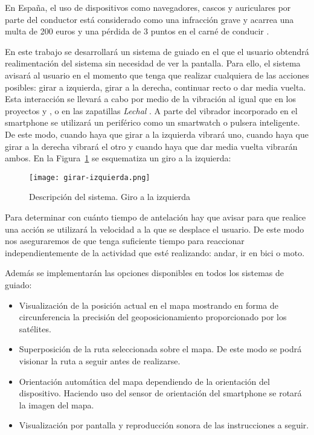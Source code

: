 \documentclass{pre-tfg}
\begin{document}
En España, el uso de dispositivos como navegadores, cascos y auriculares por parte del conductor está considerado como una infracción grave y acarrea una multa de 200 euros y una pérdida de 3 puntos en el carné de conducir \cite{Serrano14} .

En este trabajo se desarrollará un sistema de guiado en el que el usuario obtendrá realimentación del sistema sin necesidad de ver la pantalla. Para ello, el sistema avisará al usuario en el momento que tenga que realizar cualquiera de las acciones posibles: girar a izquierda, girar a la derecha, continuar recto o dar media vuelta. Esta interacción se llevará a cabo por medio de la vibración al igual que en los proyectos \cite{Boemo12} y \cite{Merino13}, o en las zapatillas \textit{Lechal} \cite{Lechal} . A parte del vibrador incorporado en el smartphone se utilizará un periférico como un smartwatch o pulsera inteligente. De este modo, cuando haya que girar a la izquierda vibrará uno, cuando haya que girar a la derecha vibrará el otro y cuando haya que dar media vuelta vibrarán ambos. En la Figura~\ref{fig:descipcion_sistema} se esquematiza un giro a la izquierda:

\begin{figure}[!h]
  \begin{center}
    \texttt{[image: girar-izquierda.png]}
    \caption{Descripción del sistema. Giro a la izquierda}
    \label{fig:descipcion_sistema}
  \end{center}
  \vspace{-25pt}
\end{figure}

Para determinar con cuánto tiempo de antelación hay que avisar para que realice una acción se utilizará la velocidad a la que se desplace el usuario. De este modo nos aseguraremos de que tenga suficiente tiempo para reaccionar independientemente de la actividad que esté realizando: andar, ir en bici o moto.

Además se implementarán las opciones disponibles en todos los sistemas de guiado:

\begin{itemize}
  \item Visualización de la posición actual en el mapa mostrando en forma de circunferencia la precisión del geoposicionamiento proporcionado por los satélites.
  \item Superposición de la ruta seleccionada sobre el mapa. De este modo se podrá visionar la ruta a seguir antes de realizarse.
  \item Orientación automática del mapa dependiendo de la orientación del dispositivo. Haciendo uso del sensor de orientación del smartphone se rotará la imagen del mapa.
  \item Visualización por pantalla y reproducción sonora de las instrucciones a seguir. 
\end{itemize}
\end{document}
